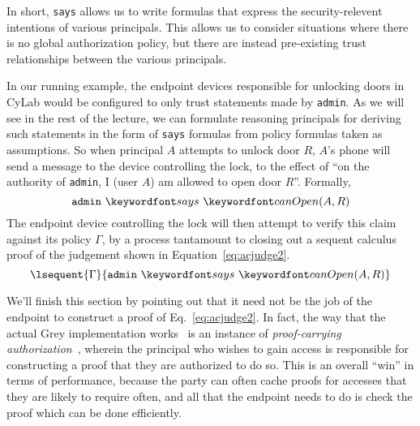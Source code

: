\documentclass[11pt,twoside]{scrartcl}
\begin{document}
In short, \verb'says' allows us to write formulas that express the security-relevent intentions of various principals. This allows us to consider situations where there is no global authorization policy, but there are instead pre-existing trust relationships between the various principals. 

In our running example, the endpoint devices responsible for unlocking doors in CyLab would be configured to only trust statements made by \verb'admin'. As we will see in the rest of the lecture, we can formulate reasoning principals for deriving such statements in the form of \verb'says' formulas from policy formulas taken as assumptions. So when principal $A$ attempts to unlock door $R$, $A$'s phone will send a message to the device controlling the lock, to the effect of ``on the authority of \verb'admin', I (user $A$) am allowed to open door $R$''. Formally,
\begin{equation}
\says{\mathtt{admin}}{\canopen(A,R)}
\end{equation}
The endpoint device controlling the lock will then attempt to verify this claim against its policy $\Gamma$, by a process tantamount to closing out a sequent calculus proof of the judgement shown in Equation~\ref{eq:acjudge2}.
\begin{equation}
\label{eq:acjudge2}
\lsequent{\Gamma}{\says{\mathtt{admin}}{\canopen(A,R)}}
\end{equation}

We'll finish this section by pointing out that it need not be the job of the endpoint to construct a proof of Eq.~\ref{eq:acjudge2}. In fact, the way that the actual Grey implementation works~\cite{Bauer2005} is an instance of \emph{proof-carrying authorization}~\cite{ChaudhuriG09}, wherein the principal who wishes to gain access is responsible for constructing a proof that they are authorized to do so. This is an overall ``win'' in terms of performance, because the party can often cache proofs for accesses that they are likely to require often, and all that the endpoint needs to do is check the proof which can be done efficiently.
\end{document}
